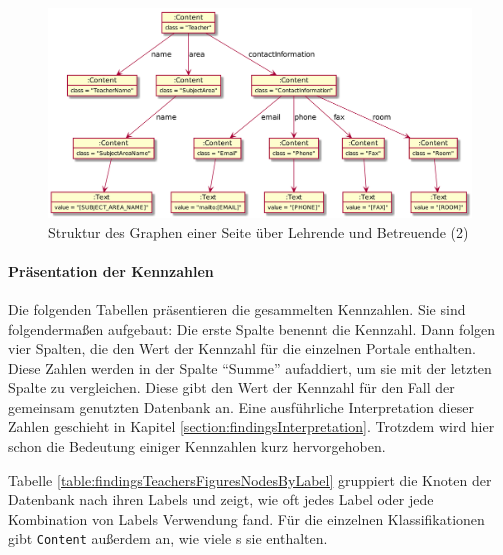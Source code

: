    \begin{figure}[htb]
        \centering
        \includegraphics[scale=\imageScalingFactor]{../resources/findings/case-study-1/dbmodel/dbmodel2.png}
        \caption{Struktur des Graphen einer Seite über Lehrende und Betreuende (2)}
        \label{image:findingTeachersFiguresDbModel2}
    \end{figure}

    \paragraph{Präsentation der Kennzahlen}
    Die folgenden Tabellen präsentieren die gesammelten Kennzahlen.
    Sie sind folgendermaßen aufgebaut:
    Die erste Spalte benennt die Kennzahl.
    Dann folgen vier Spalten, die den Wert der Kennzahl für die einzelnen Portale enthalten.
    Diese Zahlen werden in der Spalte "`Summe"' aufaddiert,
    um sie mit der letzten Spalte zu vergleichen.
    Diese gibt den Wert der Kennzahl für den Fall der gemeinsam genutzten Datenbank an.
    Eine ausführliche Interpretation dieser Zahlen geschieht in Kapitel \ref{section:findingsInterpretation}.
    Trotzdem wird hier schon die Bedeutung einiger Kennzahlen kurz hervorgehoben.

    Tabelle \ref{table:findingsTeachersFiguresNodesByLabel}
    gruppiert die Knoten der Datenbank nach ihren Labels und zeigt,
    wie oft jedes Label oder jede Kombination von Labels Verwendung fand.   
    Für die einzelnen Klassifikationen gibt \texttt{Content} außerdem an,
    wie viele {\contentFeature}s sie enthalten.


